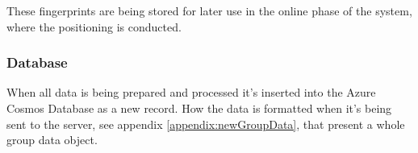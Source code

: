 
These fingerprints are being stored for later use in the online phase of the system, where the positioning is conducted.



\subsubsection{Database}\label{sec:implServerGroupCreationDatabase}
When all data is being prepared and processed it's inserted into the Azure Cosmos Database as a new record.
How the data is formatted when it's being sent to the server, see appendix \ref{appendix:newGroupData}, that present a whole group data object.
